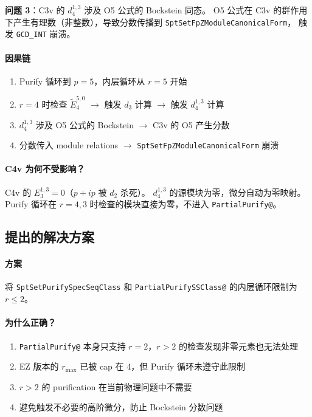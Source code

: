 \documentclass[a4paper,fontset=ubuntu,12pt]{ctexart}
\begin{document}
\textbf{问题 3}：C3v 的 $d_4^{1,3}$ 涉及 O5 公式的 Bockstein 同态。
O5 公式在 C3v 的群作用下产生有理数（非整数），导致分数传播到 \texttt{SptSetFpZModuleCanonicalForm}，
触发 \texttt{GCD\_INT} 崩溃。

\paragraph{因果链}
\begin{enumerate}
\item Purify 循环到 $p=5$，内层循环从 $r=5$ 开始
\item $r=4$ 时检查 $\tilde{E}_4^{5,0}$ $\to$ 触发 $d_3$ 计算 $\to$ 触发 $d_4^{1,3}$ 计算
\item $d_4^{1,3}$ 涉及 O5 公式的 Bockstein $\to$ C3v 的 O5 产生分数
\item 分数传入 module relations $\to$ \texttt{SptSetFpZModuleCanonicalForm} 崩溃
\end{enumerate}

\paragraph{C4v 为何不受影响？}
C4v 的 $E_3^{1,3} = 0$（$p{+}ip$ 被 $d_2$ 杀死）。
$d_4^{1,3}$ 的源模块为零，微分自动为零映射。
Purify 循环在 $r=4,3$ 时检查的模块直接为零，不进入 \texttt{PartialPurify@}。

\subsection{提出的解决方案}
\label{sec:c3v-fix}

\paragraph{方案}
将 \texttt{SptSetPurifySpecSeqClass} 和 \texttt{PartialPurifySSClass@} 的内层循环限制为 $r \le 2$。

\paragraph{为什么正确？}
\begin{enumerate}
\item \texttt{PartialPurify@} 本身只支持 $r=2$，$r > 2$ 的检查发现非零元素也无法处理
\item EZ 版本的 $r_{\max}$ 已被 cap 在 4，但 Purify 循环未遵守此限制
\item $r > 2$ 的 purification 在当前物理问题中不需要
\item 避免触发不必要的高阶微分，防止 Bockstein 分数问题
\end{enumerate}
\end{document}
